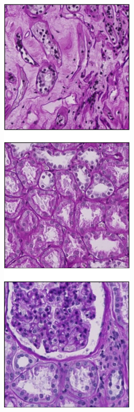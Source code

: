 \begin{figure}[H]
	\centering
	\begin{subfigure}[b]{0.24\textwidth}
		\centering
		\includegraphics[width=\textwidth]{gambar/bab4/image_hasil.png}

\end{subfigure}
\end{figure}
